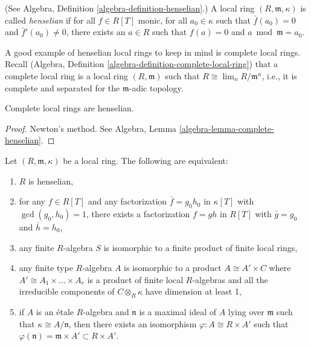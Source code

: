 \begin{definition}
\label{definition-henselian}
(See Algebra, Definition \ref{algebra-definition-henselian}.)
A local ring $(R, \mathfrak m, \kappa)$ is called
{\it henselian} if for all
$f \in R[T]$ monic, for all $a_0 \in \kappa$ such that
$\bar f(a_0) = 0$ and $\bar f'(a_0) \neq 0$, there exists
an $a \in R$ such that $f(a) = 0$ and $a \bmod \mathfrak m = a_0$.
\end{definition}

\noindent
A good example of henselian local rings
to keep in mind is complete local rings.
Recall
(Algebra, Definition \ref{algebra-definition-complete-local-ring})
that a complete local ring is a local ring $(R, \mathfrak m)$ such that
$R \cong \lim_n R/\mathfrak m^n$, i.e., it is complete and separated
for the $\mathfrak m$-adic topology.

\begin{theorem}
\label{theorem-hensel}
Complete local rings are henselian.
\end{theorem}

\begin{proof}
Newton's method. See
Algebra, Lemma \ref{algebra-lemma-complete-henselian}.
\end{proof}

\begin{theorem}
\label{theorem-henselian}
Let $(R, \mathfrak m, \kappa)$ be a local ring. The following are equivalent:
\begin{enumerate}
\item $R$ is henselian,
\item for any $f\in R[T]$ and any factorization $\bar f = g_0 h_0$ in
$\kappa[T]$ with $\gcd(g_0, h_0)=1$, there exists a factorization $f=gh$ in
$R[T]$ with $\bar g = g_0$ and $\bar h = h_0$,
\item any finite $R$-algebra $S$ is isomorphic to a finite product of finite
local rings,
\item any finite type $R$-algebra $A$ is isomorphic to a product
$A \cong A' \times C$ where $A' \cong A_1 \times \ldots \times A_r$
is a product of finite local $R$-algebras and all the irreducible
components of $C \otimes_R \kappa$ have dimension at least 1,
\item if $A$ is an \'etale $R$-algebra and $\mathfrak n$ is a maximal ideal of
$A$ lying over $\mathfrak m$ such that $\kappa \cong A/\mathfrak n$, then there
exists an isomorphism $\varphi: A \cong R \times A'$ such that
$\varphi(\mathfrak n) = \mathfrak m \times A' \subset R \times A'$.
\end{enumerate}
\end{theorem}

